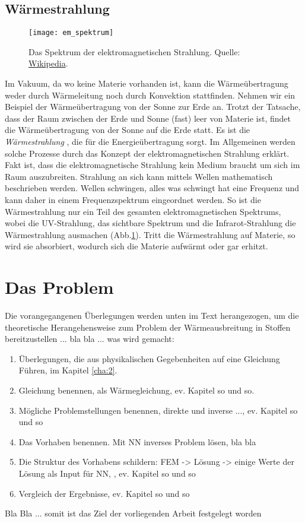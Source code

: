 \subsection{Wärmestrahlung}

\begin{figure}[!h]
	\centering
	\texttt{[image: em\_spektrum]}
	\caption{Das Spektrum der elektromagnetischen Strahlung. Quelle: \href{https://de.wikipedia.org/wiki/Elektromagnetisches_Spektrum}{Wikipedia}.}
	\label{fig:1.1.3_1}
\end{figure}

Im Vakuum, da wo keine Materie vorhanden ist, kann die Wärmeübertragung weder durch Wärmeleitung noch durch Konvektion stattfinden. Nehmen wir ein Beispiel der Wärmeübertragung von der Sonne zur Erde an. Trotzt der Tatsache, dass der Raum zwischen der Erde und Sonne (fast) leer von Materie ist, findet die Wärmeübertragung von der Sonne auf die Erde statt. Es ist die \textit{Wärmestrahlung }, die für die Energieübertragung sorgt. Im Allgemeinen werden solche Prozesse durch das Konzept der elektromagnetischen Strahlung erklärt. Fakt ist, dass die elektromagnetische Strahlung kein Medium braucht um sich im Raum auszubreiten. Strahlung an sich kann mittels Wellen mathematisch beschrieben werden. Wellen schwingen, alles was schwingt hat eine Frequenz und kann daher in einem Frequenzspektrum eingeordnet werden. So ist die Wärmestrahlung nur ein Teil des gesamten elektromagnetischen Spektrums, wobei die UV-Strahlung, das sichtbare Spektrum und die Infrarot-Strahlung die Wärmestrahlung ausmachen (Abb.\ref{fig:1.1.3_1}). Tritt die Wärmestrahlung auf Materie, so wird sie absorbiert, wodurch sich die Materie aufwärmt oder gar erhitzt.

\section{Das Problem}

Die vorangegangenen Überlegungen werden unten im Text herangezogen, um die theoretische Herangehensweise zum Problem der Wärmeausbreitung in Stoffen bereitzustellen ... bla bla ... was wird gemacht:

\begin{enumerate}
	\item Überlegungen, die aus physikalischen Gegebenheiten auf eine Gleichung Führen, im Kapitel \ref{cha:2}.
	\item Gleichung benennen, als Wärmegleichung, ev. Kapitel so und so.
	\item Mögliche Problemstellungen benennen, direkte und inverse ..., ev. Kapitel so und so
	\item Das Vorhaben benennen. Mit NN inverses Problem lösen, bla bla
	\item Die Struktur des Vorhabens schildern: FEM -> Lösung -> einige Werte der Lösung als Input für NN, , ev. Kapitel so und so
	\item Vergleich der Ergebnisse, ev. Kapitel so und so
\end{enumerate}
 Bla Bla ... somit ist das Ziel der vorliegenden Arbeit festgelegt worden
